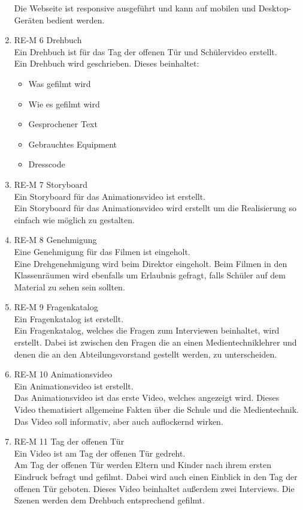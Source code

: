 \begin{enumerate}
Die Webseite ist responsive ausgeführt und kann auf mobilen und Desktop-Geräten bedient werden. 
\item RE-M 6 Drehbuch\\
Ein Drehbuch ist für das Tag der offenen Tür und Schülervideo erstellt.\\
Ein Drehbuch wird geschrieben. Dieses beinhaltet:\\
\begin{itemize}
\item Was gefilmt wird
\item Wie es gefilmt wird
\item Gesprochener Text 
\item Gebrauchtes Equipment
\item Dresscode
\end{itemize}
\item RE-M 7 Storyboard\\
Ein Storyboard für das Animationsvideo ist erstellt.\\
Ein Storyboard für das Animationsvideo wird erstellt um die Realisierung so einfach wie möglich zu gestalten.
\item RE-M 8 Genehmigung \\
Eine Genehmigung für das Filmen ist eingeholt.\\
Eine Drehgenehmigung wird beim Direktor eingeholt. Beim Filmen in den Klassenräumen wird ebenfalls um Erlaubnis gefragt, falls Schüler auf dem Material zu sehen sein sollten.
\item RE-M 9 Fragenkatalog\\
Ein Fragenkatalog ist erstellt.\\
Ein Fragenkatalog, welches die Fragen zum Interviewen beinhaltet, wird erstellt. Dabei ist zwischen den Fragen die an einen Medientechniklehrer und denen die an den Abteilungsvorstand gestellt werden, zu unterscheiden.
\item RE-M 10 Animationsvideo \\
Ein Animationsvideo ist erstellt.\\
Das Animationsvideo ist das erste Video, welches angezeigt wird. Dieses Video thematisiert allgemeine Fakten über die Schule und die Medientechnik. Das Video soll informativ, aber auch auflockernd wirken.
\item RE-M 11 Tag der offenen Tür\\
Ein Video ist am Tag der offenen Tür gedreht.\\
Am Tag der offenen Tür werden Eltern und Kinder nach ihrem ersten Eindruck befragt und gefilmt. Dabei wird auch einen Einblick in den Tag der offenen Tür geboten. Dieses Video beinhaltet außerdem zwei Interviews. Die Szenen werden dem Drehbuch entsprechend gefilmt.

\end{enumerate}
